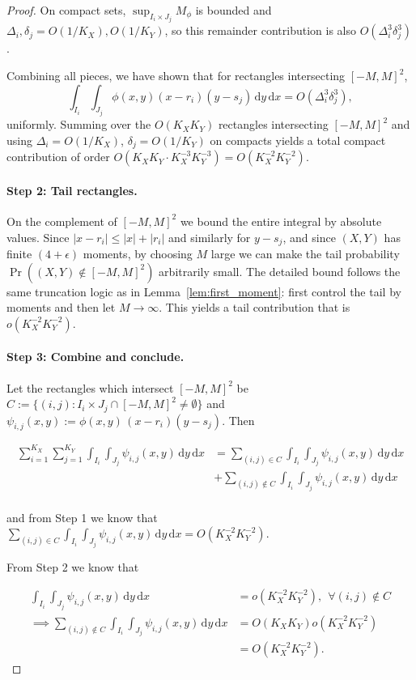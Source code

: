 \documentclass{article}
\newcommand{\abs}[1]{\left\lvert #1 \right\rvert}
\newcommand{\dd}{\,\mathrm{d}}
\begin{document}
\begin{proof}
On compact sets, $\sup_{I_i\times J_j}M_\phi$ is bounded and $\Delta_i,\delta_j=O(1/K_X),O(1/K_Y)$, so this remainder contribution is also $O(\Delta_i^3\delta_j^3)$.

Combining all pieces, we have shown that for rectangles intersecting $[-M,M]^2$,
\[
\int_{I_i}\int_{J_j}\phi(x,y)(x-r_i)(y-s_j)\dd y\dd x = O(\Delta_i^3\delta_j^3),
\]
uniformly. Summing over the $O(K_XK_Y)$ rectangles intersecting $[-M,M]^2$ and using $\Delta_i=O(1/K_X)$, $\delta_j=O(1/K_Y)$ on compacts yields a total compact contribution of order $O(K_XK_Y\cdot K_X^{-3}K_Y^{-3})=O(K_X^{-2}K_Y^{-2})$.

\paragraph*{Step 2: Tail rectangles.}
On the complement of $[-M,M]^2$ we bound the entire integral by absolute values. Since $\abs{x-r_i}\le \abs{x}+\abs{r_i}$ and similarly for $y-s_j$, and since $(X,Y)$ has finite $(4+\epsilon)$ moments, by choosing $M$ large we can make the tail probability $\Pr((X,Y)\notin[-M,M]^2)$ arbitrarily small. The detailed bound follows the same truncation logic as in Lemma~\ref{lem:first_moment}: first control the tail by moments and then let $M\to\infty$. This yields a tail contribution that is $o(K_X^{-2}K_Y^{-2})$.

\paragraph*{Step 3: Combine and conclude.}

Let the rectangles which intersect $[-M,M]^2$ be $C := \{(i,j) : I_i \times J_j \cap [-M,M]^2 \neq \emptyset  \}$ and $\psi_{i,j}(x,y) := \phi(x,y)\,(x-r_i)(y-s_j)$. Then

\begin{align*}
    \sum_{i=1}^{K_X}\sum_{j=1}^{K_Y}\int_{I_i}\int_{J_j}\psi_{i,j}(x,y)
\dd y\dd x &= \sum_{(i,j) \in C} \int_{I_i}\int_{J_j}  
\psi_{i,j}(x,y)\dd y\dd x\\
&+  \sum_{(i,j) \not\in C} \int_{I_i}\int_{J_j} \psi_{i,j}(x,y) \dd y \dd x\\
\end{align*}

and from Step 1 we know that $\sum_{(i,j) \in C} \int_{I_i}\int_{J_j}  
\psi_{i,j}(x,y)\dd y\dd x = O(K_X^{-2} K_Y^{-2})$. 

From Step 2 we know that

\begin{align*}
    \int_{I_i}\int_{J_j} \psi_{i,j}(x,y) \dd y \dd x &= o(K_X^{-2} K_Y^{-2}), ~~ \forall (i,j) \not\in C\\
    \implies \sum_{(i,j) \not\in C} \int_{I_i}\int_{J_j} \psi_{i,j}(x,y) \dd y \dd x &= O(K_X K_Y) o(K_X^{-2} K_Y^{-2})\\
    &= O(K_X^{-2} K_Y^{-2}).
\end{align*}



\end{proof}
\end{document}
